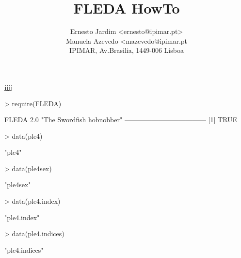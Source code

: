\documentclass[a4paper]{article}
\begin{document}
\title{FLEDA HowTo}
\author{Ernesto Jardim <ernesto@ipimar.pt>\\
Manuela Azevedo <mazevedo@ipimar.pt\\
IPIMAR, Av.Brasilia, 1449-006 Lisboa}
\date{}
\maketitle
jjjj
\begin{Schunk}
\begin{Sinput}
> require(FLEDA)
\end{Sinput}
\begin{Soutput}
FLEDA 2.0 "The Swordfish hobnobber"
------------------------------------
[1] TRUE
\end{Soutput}
\begin{Sinput}
> data(ple4)
\end{Sinput}
\begin{Soutput}
[1] "ple4"
\end{Soutput}
\begin{Sinput}
> data(ple4sex)
\end{Sinput}
\begin{Soutput}
[1] "ple4sex"
\end{Soutput}
\begin{Sinput}
> data(ple4.index)
\end{Sinput}
\begin{Soutput}
[1] "ple4.index"
\end{Soutput}
\begin{Sinput}
> data(ple4.indices)
\end{Sinput}
\begin{Soutput}
[1] "ple4.indices"
\end{Soutput}
\end{Schunk}
\end{document}

